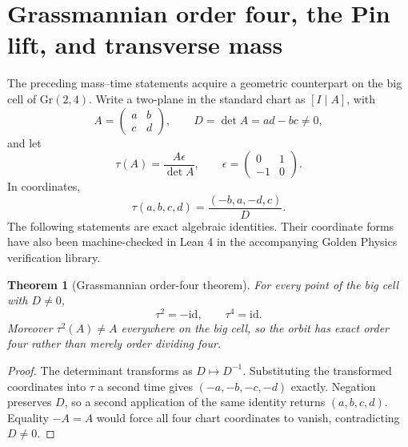 \documentclass[11pt]{article}
\newcommand{\Gr}{\mathrm{Gr}}
\newtheorem{theorem}{Theorem}[section]
\theoremstyle{definition}\newtheorem{definition}[theorem]{Definition}
\theoremstyle{remark}\newtheorem{remark}[theorem]{Remark}\newtheorem{conjecture}[theorem]{Conjecture}
\begin{document}
\section{Grassmannian order four, the Pin lift, and transverse mass}\label{sec:grassmass}
The preceding mass--time statements acquire a geometric counterpart on the big cell of $\Gr(2,4)$. Write a two-plane in the standard chart as $[I\mid A]$, with
\begin{equation}
 A=\begin{pmatrix}a&b\\c&d\end{pmatrix},\qquad D=\det A=ad-bc\neq0,
\end{equation}
and let
\begin{equation}\label{eq:tau}
 \tau(A)=\frac{A\epsilon}{\det A},
 \qquad
 \epsilon=\begin{pmatrix}0&1\\-1&0\end{pmatrix}.
\end{equation}
In coordinates,
\begin{equation}
 \tau(a,b,c,d)=\frac{(-b,a,-d,c)}{D}.
\end{equation}
The following statements are exact algebraic identities. Their coordinate forms have also been machine-checked in Lean 4 in the accompanying Golden Physics verification library.

\begin{theorem}[Grassmannian order-four theorem]\label{thm:grassorder4}
For every point of the big cell with $D\neq0$,
\begin{equation}\label{eq:tau2tau4}
 \boxed{\tau^2=-\mathrm{id}},\qquad
 \boxed{\tau^4=\mathrm{id}}.
\end{equation}
Moreover $\tau^2(A)\neq A$ everywhere on the big cell, so the orbit has exact order four rather than merely order dividing four.
\end{theorem}
\begin{proof}
The determinant transforms as $D\mapsto D^{-1}$. Substituting the transformed coordinates into $\tau$ a second time gives $(-a,-b,-c,-d)$ exactly. Negation preserves $D$, so a second application of the same identity returns $(a,b,c,d)$. Equality $-A=A$ would force all four chart coordinates to vanish, contradicting $D\neq0$.
\end{proof}
\end{document}
